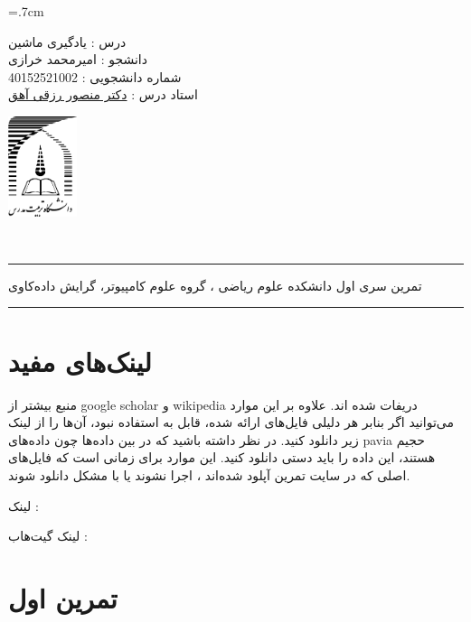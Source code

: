 \documentclass[a4paper, 12pt]{article}
\begin{document}
	
\noindent
\begin{minipage}[c]{5cm}
	\baselineskip=.7cm
	\begin{flushright}
		درس : یادگیری ماشین 
		\\
		دانشجو :
		امیرمحمد خرازی
		\\
		شماره دانشجویی :
		40152521002 
		\\
		استاد درس :  
		\href{mrezghi.ir}{دکتر منصور رزقی آهق}
	\end{flushright}
\end{minipage}
\hfill
\begin{minipage}[c]{3cm}
	\begin{center}
		\href{modares.ac.ir}{
			\includegraphics[width=2cm]{logo.png}}
	\end{center}	
\end{minipage}
\\[1mm]
\hrule depth .5mm \relax
\begin{flushright}
	تمرین سری اول
	\hfill
	دانشکده علوم ریاضی ، گروه علوم کامپیوتر، گرایش داده‌کاوی
\end{flushright}

\hrule depth .5mm\relax


\section*{لینک‌های مفید}

منبع بیشتر از google scholar و wikipedia  دریفات شده اند. 
علاوه بر این موارد می‌توانید اگر بنابر هر دلیلی فایل‌های ارائه شده، قابل به استفاده نبود، آن‌ها را از لینک زیر دانلود کنید. در نظر داشته باشید که در بین داده‌ها چون داده‌های pavia حجیم هستند، این داده را باید دستی دانلود کنید. 
این موارد برای زمانی است که فایل‌های اصلی که در سایت تمرین آپلود شده‌اند ، اجرا نشوند یا با مشکل دانلود شوند.

لینک :
\href{https://drive.google.com/drive/folders/1Cbyk2rJ3-KZH08Wu43DTUZTl_uWAqt2_?usp=sharing}{}


لینک گیت‌هاب : 
\href{https://github.com/A-M-Kharazi/Machine-Learning-TMU-HW-1.git}{}

\section*{تمرین اول }
\end{document}
